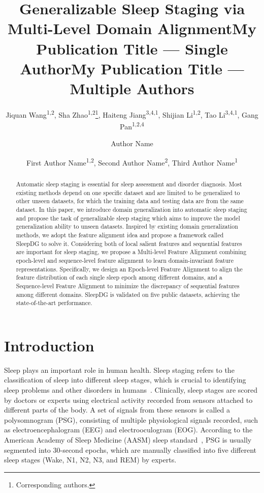 \documentclass[letterpaper]{article} %
\title{Generalizable Sleep Staging via Multi-Level Domain Alignment}
\author{
	Jiquan Wang\textsuperscript{\rm 1,\rm 2},
	Sha Zhao\textsuperscript{\rm 1,\rm 2}\thanks{Corresponding authors.},
	Haiteng Jiang\textsuperscript{\rm 3,\rm 4,\rm 1},
	Shijian Li\textsuperscript{\rm 1,\rm 2},
	Tao Li\textsuperscript{\rm 3,\rm 4,\rm 1},
	Gang Pan\textsuperscript{\rm 1,\rm 2,\rm 4}\footnotemark[1]
}
\title{My Publication Title --- Single Author}
\author {
    Author Name
}
\title{My Publication Title --- Multiple Authors}
\author {
    First Author Name\textsuperscript{\rm 1,\rm 2},
    Second Author Name\textsuperscript{\rm 2},
    Third Author Name\textsuperscript{\rm 1}
}
\begin{document}
	
	\maketitle
	
	\begin{abstract}
		Automatic sleep staging is essential for sleep assessment and disorder diagnosis. Most existing methods depend on one specific dataset and are limited to be generalized to other unseen datasets, for which the training data and testing data are from the same dataset. In this paper, we introduce domain generalization into automatic sleep staging and propose the task of generalizable sleep staging which aims to improve the model generalization ability to unseen datasets. Inspired by existing domain generalization methods, we adopt the feature alignment idea and propose a framework called SleepDG to solve it. Considering both of local salient features and sequential features are important for sleep staging, we propose a Multi-level Feature Alignment combining epoch-level and sequence-level feature alignment to learn domain-invariant feature representations. Specifically, we design an Epoch-level Feature Alignment to align the feature distribution of each single sleep epoch among different domains, and a Sequence-level Feature Alignment to minimize the discrepancy of sequential features among different domains. SleepDG is validated on five public datasets, achieving the state-of-the-art performance.
		
	\end{abstract}
	
	\section{Introduction}
	
	Sleep plays an important role in human health.
	Sleep staging refers to the classification of sleep into different sleep stages, which is crucial to identifying sleep problems and other disorders in humans~\citep{he2018effects}.
	Clinically, sleep stages are scored by doctors or experts using electrical activity recorded from sensors attached to different parts of the body.
	A set of signals from these sensors is called a polysomnogram (PSG), consisting of multiple physiological signals recorded, such as electroencephalogram (EEG) and electrooculogram (EOG).
	According to the American Academy of Sleep Medicine (AASM) sleep standard~\citep{Iber2007TheAA}, PSG is usually segmented into 30-second epochs, which are manually classified into five different sleep stages (Wake, N1, N2, N3, and REM) by experts. 
	
\end{document}
